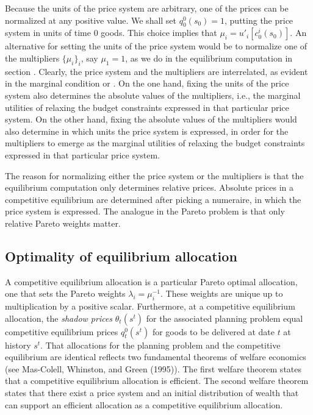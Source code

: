   Because the units of the
price system are arbitrary, one of the prices
can be  normalized
at any positive value.  We shall set $q^0_0(s_0)= 1$,
putting the price system in units of time $0$
  goods. This choice implies that
 $\mu_i  =  u'_i[c_0^i(s_0)] $.
An alternative for setting the units of the price 
system would be to normalize one of the
multipliers $\{\mu_i\}_i$, say $\mu_1=1$, as
we do in the equilibrium computation 
in section . Clearly, the price 
system and the multipliers are interrelated,
as evident in the marginal condition  
or . On the one hand, fixing the
units of the price system also determines the 
absolute values of the multipliers, i.e., the
marginal utilities of relaxing the budget
constraints expressed in that particular price 
system. On the other hand, fixing the 
absolute values of the multipliers would 
also determine in which units the price system is 
expressed, in order for the multipliers to 
emerge as the marginal utilities of relaxing 
the budget constraints expressed in that
particular price system. 

The reason for normalizing either the 
price system or the multipliers is that the
equilibrium computation only determines relative 
prices. Absolute prices in a competitive equilibrium 
are determined after picking a numeraire, in 
which the price system is expressed. The analogue 
in the Pareto problem is that only relative Pareto
weights matter.




\subsection{Optimality of equilibrium 
                          allocation}\label{sec:PO}%
  A competitive  equilibrium allocation   is a particular Pareto
optimal allocation, one that sets the Pareto weights $\lambda_i =
\mu_i^{-1}$.  These weights are unique up to multiplication by a positive scalar. Furthermore, at a
competitive equilibrium allocation, the {\it shadow prices\/}
$\theta_t(s^t)$ for the associated planning problem equal  competitive equilibrium
prices $q_t^0(s^t)$ for goods to be delivered at date $t$
at  history $s^t$. %
 That  allocations for the planning
problem and the competitive equilibrium are identical reflects 
two fundamental theorems of welfare economics (see Mas-Colell,
Whinston, and Green (1995)).
The first welfare theorem states that a  competitive equilibrium allocation is efficient.
The second welfare theorem states that there exist a price system and  an initial distribution of wealth that can support an
  efficient allocation as a competitive equilibrium allocation.

